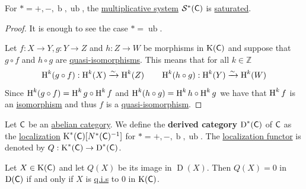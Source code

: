 \documentclass[../../main]{subfiles}
\begin{document}
\begin{lemma}
  For \(\ast = +, -, \operatorname{b}, \operatorname{ub}\), the \hyperref[def:multiplicative-system]{multiplicative system} \(\mathcal{S}^{\ast}(\mathsf{C})\) is \hyperref[def:saturated-multiplicative-system]{saturated}.
\end{lemma}
\begin{proof}
  It is enough to see the case \(\ast = \operatorname{ub}\).

  Let \(f: X \to Y, g: Y \to Z\) and \(h: Z \to W\) be morphisms in \(\operatorname{K}(\mathsf{C})\) and suppose that \(g \circ f\) and \(h \circ g\) are \hyperref[def:quasi-isomorphism]{quasi-isomorphisms}.
  This means that for all \(k \in \mathbb{Z}\)
  \begin{equation*}
    \operatorname{H}^{k}(g \circ f): \operatorname{H}^{k}(X) \xrightarrow{\sim} \operatorname{H}^{k}(Z) \qquad  \operatorname{H}^{k}(h \circ g): \operatorname{H}^{k}(Y) \xrightarrow{\sim} \operatorname{H}^{k}(W)
  \end{equation*}
  Since \(\operatorname{H}^{k}(g \circ f) = \operatorname{H}^{k}g \circ \operatorname{H}^{k}f\) and \(\operatorname{H}^{k}(h \circ g) = \operatorname{H}^{k}h \circ \operatorname{H}^{k}g\) we have that \(\operatorname{H}^{k}f\) is an \hyperref[def:categorical-isomorphism]{isomorphism} and thus \(f\) is a \hyperref[def:quasi-isomorphism]{quasi-isomorphism}.
\end{proof}

\begin{definition}\label{def:derived-category}
  Let \(\mathsf{C}\) be an \hyperref[def:abelian-category]{abelian category}.
  We define the \textbf{derived category} \(\operatorname{D}^{\ast}(\mathsf{C})\) of \(\mathsf{C}\) as the \hyperref[def:localization-category]{localization} \(\operatorname{K}^{\ast}(\mathsf{C})[N^{\ast}(\mathsf{C})^{-1}]\) for \(\ast = +, -, \operatorname{b}, \operatorname{ub}\).
  The \hyperref[def:localization-category]{localization functor} is denoted by \(Q: \operatorname{K}^{\ast}(\mathsf{C}) \to \operatorname{D}^{\ast}(\mathsf{C})\).
\end{definition}


\begin{proposition}
  Let \(X \in \operatorname{K}(\mathsf{C})\) and let \(Q(X)\) be its image in \(\operatorname{D}(X)\).
  Then \(Q(X) = 0\) in \(\operatorname{D}(\mathsf{C})\) if and only if \(X\) is \hyperref[def:quasi-isomorphism]{q.i.s} to 0 in \(\operatorname{K}(\mathsf{C})\).
\end{proposition}
\end{document}
